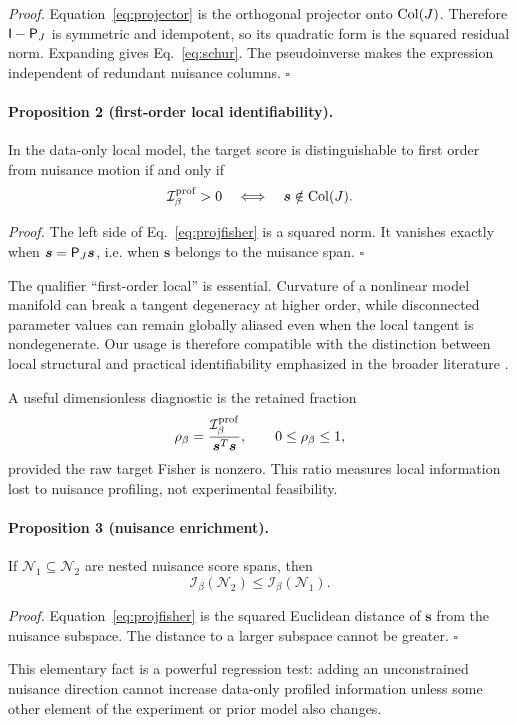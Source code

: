 \emph{Proof.} Equation~\eqref{eq:projector} is the orthogonal projector onto $\operatorname{Col}(J)$. Therefore $\mathsf I-\mathsf P_J$ is symmetric and idempotent, so its quadratic form is the squared residual norm. Expanding gives Eq.~\eqref{eq:schur}. The pseudoinverse makes the expression independent of redundant nuisance columns. \hfill$\square$

\paragraph*{Proposition 2 (first-order local identifiability).}
In the data-only local model, the target score is distinguishable to first order from nuisance motion if and only if
\begin{equation}
 \mathcal I_{\beta}^{\rm prof}>0
 \quad\Longleftrightarrow\quad
 \bm s\notin\operatorname{Col}(J).
\label{eq:identcrit}
\end{equation}

\emph{Proof.} The left side of Eq.~\eqref{eq:projfisher} is a squared norm. It vanishes exactly when $\bm s=\mathsf P_J\bm s$, i.e. when $\bm s$ belongs to the nuisance span. \hfill$\square$

The qualifier ``first-order local'' is essential. Curvature of a nonlinear model manifold can break a tangent degeneracy at higher order, while disconnected parameter values can remain globally aliased even when the local tangent is nondegenerate. Our usage is therefore compatible with the distinction between local structural and practical identifiability emphasized in the broader literature \cite{Rothenberg1971,Wieland2021,Heinrich2025}.

A useful dimensionless diagnostic is the retained fraction
\begin{equation}
 \rho_\beta=\frac{\mathcal I_{\beta}^{\rm prof}}{\bm s^T\bm s},\qquad 0\le\rho_\beta\le1,
\label{eq:retention}
\end{equation}
provided the raw target Fisher is nonzero. This ratio measures local information lost to nuisance profiling, not experimental feasibility.

\paragraph*{Proposition 3 (nuisance enrichment).}
If $\mathcal N_1\subseteq\mathcal N_2$ are nested nuisance score spans, then
\begin{equation}
 \mathcal I_\beta(\mathcal N_2)\le \mathcal I_\beta(\mathcal N_1).
\label{eq:nuisancemono}
\end{equation}

\emph{Proof.} Equation~\eqref{eq:projfisher} is the squared Euclidean distance of $\bm s$ from the nuisance subspace. The distance to a larger subspace cannot be greater. \hfill$\square$

This elementary fact is a powerful regression test: adding an unconstrained nuisance direction cannot increase data-only profiled information unless some other element of the experiment or prior model also changes.

